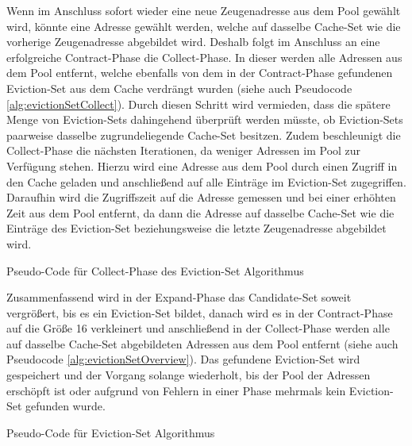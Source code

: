Wenn im Anschluss sofort wieder eine neue Zeugenadresse aus dem Pool gewählt wird, könnte eine Adresse gewählt werden, welche auf dasselbe Cache-Set wie die vorherige Zeugenadresse abgebildet wird.
Deshalb folgt im Anschluss an eine erfolgreiche Contract-Phase die Collect-Phase.
In dieser werden alle Adressen aus dem Pool entfernt, welche ebenfalls von dem in der Contract-Phase gefundenen Eviction-Set aus dem Cache verdrängt wurden (siehe auch Pseudocode \ref{alg:evictionSetCollect}).
Durch diesen Schritt wird vermieden, dass die spätere Menge von Eviction-Sets dahingehend überprüft werden müsste, ob Eviction-Sets paarweise dasselbe zugrundeliegende Cache-Set besitzen. 
Zudem beschleunigt die Collect-Phase die nächsten Iterationen, da weniger Adressen im Pool zur Verfügung stehen.
Hierzu wird eine Adresse aus dem Pool durch einen Zugriff in den Cache geladen und anschließend auf alle Einträge im Eviction-Set zugegriffen.
Daraufhin wird die Zugriffszeit auf die Adresse gemessen und bei einer erhöhten Zeit aus dem Pool entfernt, da dann die Adresse auf dasselbe Cache-Set wie die Einträge des Eviction-Set beziehungsweise die letzte Zeugenadresse abgebildet wird.

\begin{algorithm}[h]
\DontPrintSemicolon
\caption{Pseudo-Code für Collect-Phase des Eviction-Set Algorithmus}
\label{alg:evictionSetCollect}

\end{algorithm}

Zusammenfassend wird in der Expand-Phase das Candidate-Set soweit vergrößert, bis es ein Eviction-Set bildet, danach wird es in der Contract-Phase auf die Größe 16 verkleinert und anschließend in der Collect-Phase werden alle auf dasselbe Cache-Set abgebildeten Adressen aus dem Pool entfernt (siehe auch Pseudocode \ref{alg:evictionSetOverview}).
Das gefundene Eviction-Set wird gespeichert und der Vorgang solange wiederholt, bis der Pool der Adressen erschöpft ist oder aufgrund von Fehlern in einer Phase mehrmals kein Eviction-Set gefunden wurde.

\begin{algorithm}[h]
\DontPrintSemicolon
\caption{Pseudo-Code für Eviction-Set Algorithmus}
\label{alg:evictionSetOverview}

\end{algorithm}

